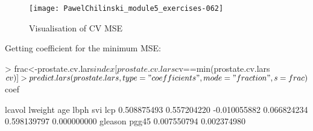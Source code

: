 \documentclass[a4paper]{article}
\begin{document}
\begin{itemize}
\begin{figure}[H]
\begin{center}
\begin{Schunk}
\begin{Sinput}
\end{Sinput}
\end{Schunk}
\texttt{[image: PawelChilinski\_module5\_exercises-062]}
\caption{Visualisation of CV MSE}
\end{center}
\end{figure}
Getting coefficient for the minimum MSE:
\begin{Schunk}
\begin{Sinput}
> frac<-prostate.cv.lars$index[prostate.cv.lars$cv==min(prostate.cv.lars$cv)]	
> predict.lars(prostate.lars, type="coefficients", mode="fraction", s=frac)$coef
\end{Sinput}
\begin{Soutput}
      lcavol      lweight          age         lbph          svi          lcp 
 0.508875493  0.557204220 -0.010055882  0.066824234  0.598139797  0.000000000 
     gleason        pgg45 
 0.007550794  0.002374980 
\end{Soutput}
\end{Schunk}
\end{itemize}
\end{document}

